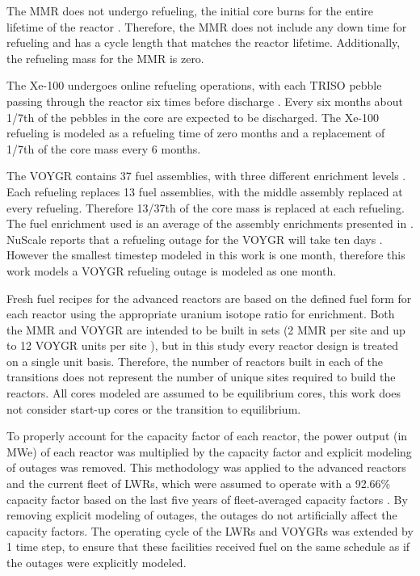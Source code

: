 The \gls{MMR} does not undergo refueling, the initial core
burns for the entire lifetime of the reactor \cite{mitchell_usnc_2020}. 
Therefore, the \gls{MMR}
does not include any down time for refueling and has a cycle length that 
matches the reactor lifetime. Additionally, the refueling mass for the
\gls{MMR} is zero. 

The Xe-100 undergoes online refueling operations, with each 
\gls{TRISO} pebble passing 
through the reactor six times before discharge \cite{mulder_overview_2021}. 
Every six months about 1/7th 
of the pebbles in the core are expected to be discharged. The Xe-100 
refueling is modeled as a refueling time of zero months and a 
replacement of 1/7th of the core mass every 
6 months.  

The VOYGR contains 37 fuel assemblies, with three different enrichment 
levels \cite{nuscale_chapter_2020-1}. Each refueling replaces 13 fuel 
assemblies, with the middle assembly replaced at every refueling. 
Therefore 13/37th of the core mass is replaced at each refueling. 
The fuel enrichment used is an average of the assembly enrichments 
presented in \cite{nuscale_chapter_2020-1}. NuScale reports that a refueling 
outage for the VOYGR will take ten days \cite{nuscale_nuscale_2022}. However 
the smallest timestep modeled in this work is one month, therefore this 
work models a VOYGR 
refueling outage is modeled as one month. 

Fresh fuel 
recipes for the advanced reactors are based on the 
defined fuel form for each reactor using the appropriate uranium isotope 
ratio for enrichment. Both the \gls{MMR} and VOYGR are intended to be built 
in sets (2 \gls{MMR} per site \cite{noauthor_usnc_2021} and up to 12 VOYGR 
units per site \cite{reyes_nuscale_2021}), but in this study every reactor 
design is treated 
on a single unit basis. Therefore, the number of reactors built in each 
of the transitions does not represent the number of unique sites required 
to build the reactors. All cores modeled are assumed to be equilibrium cores, 
this work does not consider start-up cores or the transition to equilibrium. 

To properly account for the capacity factor of each reactor, the power output 
(in MWe) of each reactor was multiplied by the capacity factor and explicit 
modeling of outages was removed. This methodology was applied to the 
advanced reactors and the current fleet of \glspl{LWR}, which were assumed 
to operate with a 92.66\% capacity factor based on the last five years of 
fleet-averaged capacity factors \cite{us_energy_information_administration_electric_2022}. 
By removing 
explicit modeling of outages, the outages do not artificially affect 
the capacity factors. The operating cycle of the \glspl{LWR} and VOYGRs 
was extended by 1 time step, to ensure that these facilities received fuel 
on the same schedule as if the outages were explicitly modeled. 

